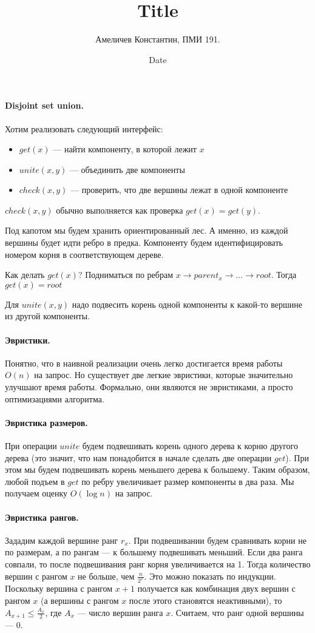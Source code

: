 \documentclass[12pt]{article}
\title{Title}
\author{Амеличев Константин, ПМИ 191.}
\date{Date}
\begin{document}
\paragraph{Disjoint set union.} Хотим реализовать следующий интерфейс:

\begin{itemize}
\item $get(x)$ --- найти компоненту, в которой лежит $x$
\item $unite(x, y)$ --- объединить две компоненты
\item $check(x, y)$ --- проверить, что две вершины лежат в одной компоненте
\end{itemize}

$check(x, y)$ обычно выполняется как проверка $get(x) = get(y)$.

Под капотом мы будем хранить ориентированный лес. А именно, из каждой вершины будет идти ребро в предка. Компоненту будем идентифицировать номером корня в соответствующем дереве.

Как делать $get(x)$? Подниматься по ребрам $x \rightarrow parent_x \rightarrow \ldots \rightarrow root$. Тогда $get(x) = root$

Для $unite(x, y)$ надо подвесить корень одной компоненты к какой-то вершине из другой компоненты.

\paragraph{Эвристики.} Понятно, что в наивной реализации очень легко достигается время работы $O(n)$ на запрос. Но существует две легкие эвристики, которые значительно улучшают время работы. Формально, они являются не эвристиками, а просто оптимизациями алгоритма.

\paragraph{Эвристика размеров.} При операции $unite$ будем подвешивать корень одного дерева к корню другого дерева (это значит, что нам понадобится в начале сделать две операции $get$). При этом мы будем подвешивать корень меньшего дерева к большему. Таким образом, любой подъем в $get$ по ребру увеличивает размер компоненты в два раза. Мы получаем оценку $O(\log n)$ на запрос.

\paragraph{Эвристика рангов.} Зададим каждой вершине ранг $r_x$. При подвешивании будем сравнивать корни не по размерам, а по рангам --- к большему подвешивать меньший. Если два ранга совпали, то после подвешивания ранг корня увеличивается на 1. Тогда количество вершин с рангом $x$ не больше, чем $\frac{n}{2^x}$. Это можно показать по индукции. Поскольку вершина с рангом $x + 1$ получается как комбинация двух вершин с рангом $x$ (а вершины с рангом $x$ после этого становятся неактивными), то $A_{x + 1} \le \frac{A_{x}}{2}$, где $A_x$ --- число вершин ранга $x$. Считаем, что ранг одной вершины --- 0.
\end{document}
